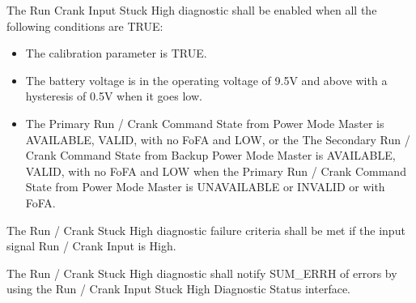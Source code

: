 {The Run Crank Input Stuck High diagnostic shall be enabled when all the following conditions are TRUE:
\begin{itemize}
\item The calibration parameter  is TRUE.
\item The battery voltage is in the operating voltage of 9.5V and above with a hysteresis of 0.5V when it goes low.
\item The Primary Run / Crank Command State from Power Mode Master is AVAILABLE, VALID, with no FoFA and LOW,
or the The Secondary Run / Crank Command State from Backup Power Mode Master is AVAILABLE, VALID, with no FoFA and LOW
when the Primary Run / Crank Command State from Power Mode Master is UNAVAILABLE or INVALID or with FoFA.
\end{itemize}
}
{}

{The Run / Crank Stuck High diagnostic failure criteria shall be met if the input signal Run / Crank Input is High.
}
{}

{The Run / Crank Stuck High diagnostic shall notify SUM_ERRH of errors by using the Run / Crank Input Stuck High Diagnostic Status interface.
}
{ }

